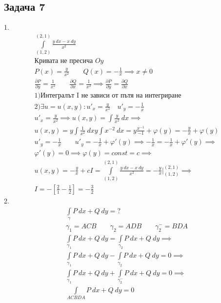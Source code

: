 \documentclass[a4paper,fleqn,12pt]{article}
\theoremstyle{definition}
\begin{document}
\subsection*{Задача 7}
1.\\
\begin{gather*}
\int\limits_{(1,2)} ^{(2,1)} \frac{y \ dx - x \ dy}{x^2}\\
\text{Кривата не пресича $Oy$}\\
P(x) = \frac{y}{x^2} \qquad Q(x) = - \frac{1}{x} \implies x \neq 0 \\
\frac{\partial P}{\partial y} = \frac{1}{x^2} \qquad \frac{\partial Q}{\partial x} = \frac{1}{x^2} \implies \frac{\partial P}{\partial y} = \frac{\partial Q}{\partial x} \\
1) \text{Интегралът I не зависи от пътя на интегриране} \\
2) \exists u = u(x,y) : u'_x = \frac{y}{x^2} \quad u'_y = - \frac{1}{x}\\
u'_x = \frac{y}{x^2} \implies u(x,y) = \int \frac{y}{x^2} \ dx \implies \\
u(x,y) =  y \int \frac{1}{x^2} \ dx  y \int x^{-2} \ dx = y\frac{x^{-1}}{-1} + \varphi(y) = -\frac{y}{x}+ \varphi(y) \\
u'_y = - \frac{1}{x} \qquad u'_y = - \frac{1}{x} + \varphi'(y) \implies - \frac{1}{x} = - \frac{1}{x} + \varphi'(y) \implies \\
\varphi'(y) = 0 \implies \varphi(y) = const = c \implies \\
u(x,y) = - \frac{y}{x} + c 
I = \int\limits_{(1,2)} ^{(2,1)} \frac{y \ dx - x \ dy}{x^2} = -\frac{y}{x} \Big|_{(1,2)} ^{(2,1)} \implies \\
I = - \left[\frac{2}{1} - \frac{1}{2}\right] = - \frac{3}{2}
\end{gather*}
2. \\
\begin{gather*}
\int\limits_{\gamma} P \ dx + Q \ dy = ? \\
\gamma_1 = ACB \qquad \gamma_2 = ADB \qquad \gamma^- _2 = BDA \\
\int\limits_{\gamma_1} P \ dx + Q \ dy = \int\limits_{\gamma_2} P \ dx + Q \ dy \implies \\
\int\limits_{\gamma_1} P \ dx + Q \ dy - \int\limits_{\gamma_2} P \ dx + Q \ dy = 0 \implies \\ 
\int\limits_{\gamma_1} P \ dx + Q \ dy + \int\limits_{\gamma^- _2} P \ dx + Q \ dy = 0 \implies \\
\int\limits_{ACBDA} P \ dx + Q \ dy = 0 
\end{gather*}
\newpage 
\end{document}
